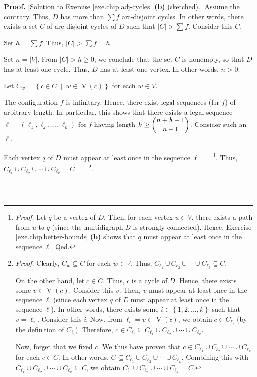 \documentclass[numbers=enddot,12pt,final,onecolumn,notitlepage]{scrartcl}%
\theoremstyle{definition}
\newenvironment{proof}[1][Proof]{\noindent\textbf{#1.} }{\ \rule{0.5em}{0.5em}}
\let\sumnonlimits\sum
\renewcommand{\sum}{\sumnonlimits\limits}
\newcommand{\abs}[1]{\left| #1 \right|}
\begin{document}
\begin{proof}
[Solution to Exercise \ref{exe.chip.adj-cycles} \textbf{(b)} (sketched).]
Assume the contrary. Thus, $D$ has more than $\sum f$ arc-disjoint cycles. In
other words, there exists a set $C$ of arc-disjoint cycles of $D$ such that
$\left\vert C\right\vert >\sum f$. Consider this $C$.

Set $h=\sum f$. Thus, $\left\vert C\right\vert >\sum f=h$.

Set $n = \abs{V}$. From $\abs{C} > h \geq 0$, we conclude that the
set $C$ is nonempty, so that $D$ has at least one cycle.
Thus, $D$ has at least one vertex.
In other words, $n > 0$.

Let $C_{w}=\left\{  c\in C\ \mid\ w\in\operatorname*{V}\left(  c\right)
\right\}  $ for each $w\in V$.

The configuration $f$ is infinitary. Hence, there exist legal sequences (for
$f$) of arbitrary length. In particular, this shows that there exists a legal
sequence $\ell=\left(  \ell_{1},\ell_{2},\ldots,\ell_{k}\right)  $ for $f$
having length $k\geq\dbinom{n+h-1}{n-1}$. Consider such an $\ell$.

Each vertex $q$ of $D$ must appear  at least once in the sequence $\ell
$\ \ \ \ \footnote{\textit{Proof.} Let $q$ be a vertex of $D$. Then, for each
vertex $u\in V$, there exists a path from $u$ to $q$ (since the multidigraph
$D$ is strongly connected). Hence, Exercise \ref{exe.chip.better-bounds}
\textbf{(b)} shows that $q$ must appear at least once in the sequence $\ell$.
Qed.}. Thus, $C_{\ell_{1}}\cup C_{\ell_{2}}\cup\cdots\cup C_{\ell_{k}}%
=C$\ \ \ \ \footnote{\textit{Proof.} Clearly, $C_{w}\subseteq C$ for each
$w\in V$. Thus, $C_{\ell_{1}}\cup C_{\ell_{2}}\cup\cdots\cup C_{\ell_{k}%
}\subseteq C$.
\par
On the other hand, let $c\in C$. Thus, $c$ is a cycle of $D$. Hence, there
exists some $v\in\operatorname*{V}\left(  c\right)  $. Consider this $v$.
Then, $v$ must appear at least once in the sequence $\ell$ (since each vertex
$q$ of $D$ must appear at least once in the sequence $\ell$). In other words,
there exists some $i\in\left\{  1,2,\ldots,k\right\}  $ such that $v=\ell_{i}%
$. Consider this $i$. Now, from $\ell_{i}=v\in\operatorname*{V}\left(
c\right)  $, we obtain $c\in C_{\ell_{i}}$ (by the definition of $C_{\ell_{i}%
}$). Therefore, $c\in C_{\ell_{i}}\subseteq C_{\ell_{1}}\cup C_{\ell_{2}}%
\cup\cdots\cup C_{\ell_{k}}$.
\par
Now, forget that we fixed $c$. We thus have proven that $c\in C_{\ell_{1}}\cup
C_{\ell_{2}}\cup\cdots\cup C_{\ell_{k}}$ for each $c\in C$. In other words,
$C\subseteq C_{\ell_{1}}\cup C_{\ell_{2}}\cup\cdots\cup C_{\ell_{k}}$.
Combining this with $C_{\ell_{1}}\cup C_{\ell_{2}}\cup\cdots\cup C_{\ell_{k}%
}\subseteq C$, we obtain $C_{\ell_{1}}\cup C_{\ell_{2}}\cup\cdots\cup
C_{\ell_{k}}=C$.}.


\end{proof}
\end{document}
